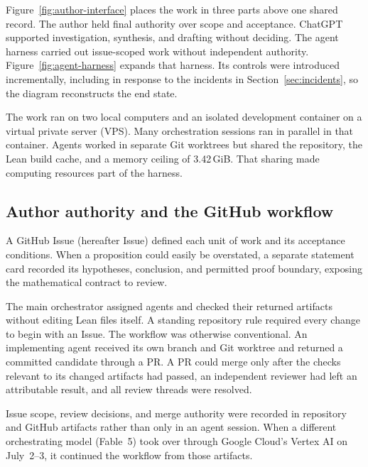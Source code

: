 Figure~\ref{fig:author-interface} places the work in three parts above one
shared record. The author held final authority over scope and acceptance.
ChatGPT supported investigation, synthesis, and drafting without deciding.
The agent harness carried out issue-scoped work without independent
authority. %
Figure~\ref{fig:agent-harness} expands that harness. Its controls were
introduced incrementally, including in response to the incidents in
Section~\ref{sec:incidents}, so the diagram reconstructs the end state. %

The work ran on two local computers and an isolated development
container on a virtual private server (VPS). Many orchestration sessions
ran in parallel in that container. Agents worked in separate Git worktrees
but shared the repository, the Lean build cache, and a memory ceiling of
3.42\,GiB. That sharing made computing resources part of the harness. %

\subsection{Author authority and the GitHub workflow}

A GitHub Issue (hereafter Issue) defined each unit of work and its
acceptance conditions. When a proposition could easily be overstated, a
separate statement card recorded its hypotheses, conclusion, and permitted
proof boundary, exposing the mathematical contract to review. %

The main orchestrator assigned agents and checked their returned artifacts
without editing Lean files itself. A standing repository rule required every change to begin with an
Issue. The workflow was otherwise conventional. An implementing agent
received its own branch and Git worktree and returned a committed
candidate through a PR. A PR could merge only after the checks relevant
to its changed artifacts had passed, an independent reviewer had left an
attributable result, and all review threads were resolved.

Issue scope, review decisions, and merge authority were recorded in
repository and GitHub artifacts rather than only in an agent session. When
a different orchestrating model (Fable~5) took over through Google Cloud's
Vertex AI on July~2--3, it continued the workflow from those artifacts.

